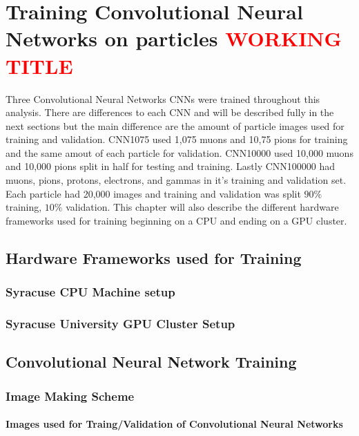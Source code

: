 \chapter{Training Convolutional Neural Networks on particles \textcolor{red}{\textbf{WORKING TITLE}}}\label{ch:cnn_train}
Three Convolutional Neural Networks CNNs were trained throughout this analysis. There are differences to each CNN and will be described fully in the next sections but the main difference are the amount of particle images used for training and validation. CNN1075 used 1,075 muons and 10,75 pions for training and the same amout of each particle for validation. CNN10000 used 10,000 muons and 10,000 pions split in half for testing and training. Lastly CNN100000 had muons, pions, protons, electrons, and gammas in it's training and validation set. Each particle had 20,000 images and training and validation was split $90\%$ training, $10\%$ validation. This chapter will also describe the different hardware frameworks used for training beginning on a CPU and ending on a GPU cluster.  


\section{Hardware Frameworks used for Training}
\subsection{Syracuse CPU Machine setup}
\subsection{Syracuse University GPU Cluster Setup}


\section{Convolutional Neural Network Training}\label{research approach}

\subsection{Image Making Scheme}\label{image_making} 
\subsubsection{Images used for Traing/Validation of Convolutional Neural Networks}

